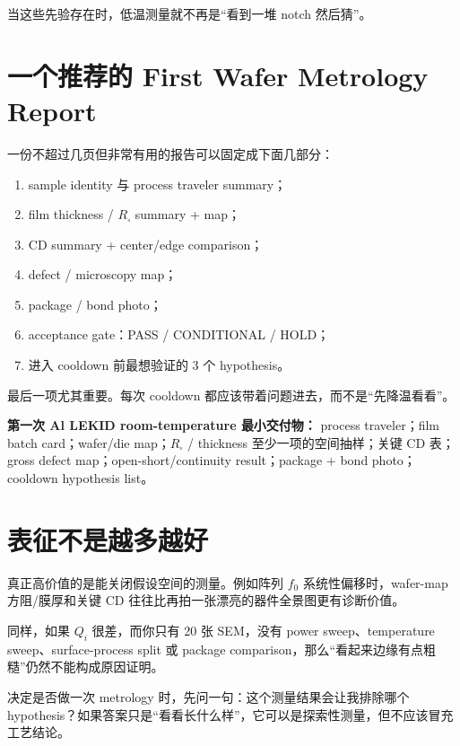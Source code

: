 当这些先验存在时，低温测量就不再是“看到一堆 notch 然后猜”。

\section{一个推荐的 First Wafer Metrology Report}

一份不超过几页但非常有用的报告可以固定成下面几部分：

\begin{enumerate}
  \item sample identity 与 process traveler summary；
  \item film thickness / $R_\square$ summary + map；
  \item CD summary + center/edge comparison；
  \item defect / microscopy map；
  \item package / bond photo；
  \item acceptance gate：PASS / CONDITIONAL / HOLD；
  \item 进入 cooldown 前最想验证的 3 个 hypothesis。
\end{enumerate}

最后一项尤其重要。每次 cooldown 都应该带着问题进去，而不是“先降温看看”。

\begin{measurebox}
\textbf{第一次 Al LEKID room-temperature 最小交付物：}
process traveler；film batch card；wafer/die map；$R_\square$ / thickness 至少一项的空间抽样；关键 CD 表；gross defect map；open-short/continuity result；package + bond photo；cooldown hypothesis list。
\end{measurebox}

\section{表征不是越多越好}

真正高价值的是能关闭假设空间的测量。例如阵列 $f_0$ 系统性偏移时，wafer-map 方阻/膜厚和关键 CD 往往比再拍一张漂亮的器件全景图更有诊断价值。

同样，如果 $Q_i$ 很差，而你只有 20 张 SEM，没有 power sweep、temperature sweep、surface-process split 或 package comparison，那么“看起来边缘有点粗糙”仍然不能构成原因证明。

\begin{checkpointbox}
决定是否做一次 metrology 时，先问一句：这个测量结果会让我排除哪个 hypothesis？如果答案只是“看看长什么样”，它可以是探索性测量，但不应该冒充工艺结论。
\end{checkpointbox}

